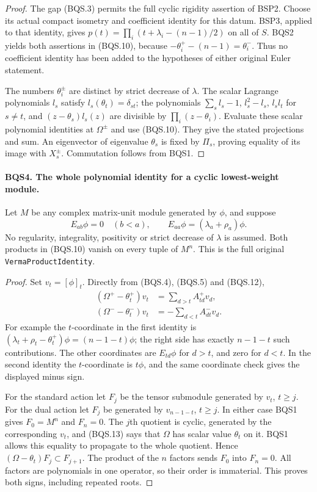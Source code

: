 \begin{proof}
The gap (BQS.3) permits the full cyclic rigidity assertion of BSP2.
Choose its actual compact isometry and coefficient identity for this
datum.  BSP3, applied to that identity, gives
$p(t)=\prod_i(t+\lambda_i-(n-1)/2)$ on all of $S$.
BQS2 yields both assertions in (BQS.10), because
$-\theta_i^+-(n-1)=\theta_i^-$.
Thus no coefficient identity has been added to the hypotheses of
either original Euler statement.

The numbers $\theta_i^\pm$ are distinct by strict decrease of $\lambda$.
The scalar Lagrange polynomials $l_s$ satisfy
$l_s(\theta_t)=\delta_{st}$; the polynomials
$\sum_s l_s-1$, $l_s^2-l_s$, $l_sl_t$ for $s\ne t$, and
$(z-\theta_s)l_s(z)$ are divisible by
$\prod_i(z-\theta_i)$.  Evaluate these scalar polynomial identities
at $\Omega^\pm$ and use (BQS.10).
They give the stated projections and sum.  An eigenvector of eigenvalue
$\theta_s$ is fixed by $\Pi_s$, proving equality of its image with
$X_s^\pm$.  Commutation follows from BQS1.
\end{proof}

\paragraph{BQS4. The whole polynomial identity for a cyclic lowest-weight module.}
\label{claim:BQS4}
Let $M$ be any complex matrix-unit module generated by $\phi$, and suppose
\[
 E_{ab}\phi=0\quad(b<a),\qquad
 E_{aa}\phi=(\lambda_a+\rho_a)\phi.
 \tag{BQS.12}
\]
No regularity, integrality, positivity or strict decrease of $\lambda$
is assumed.  Both products in (BQS.10) vanish on every tuple of $M^n$.
This is the full original \texttt{VermaProductIdentity}.

\begin{proof}
Set $v_t=[\phi]_t$.  Directly from (BQS.4), (BQS.5) and (BQS.12),
\[
\begin{aligned}
 (\Omega^+-\theta_t^+)v_t
    &=\sum_{d>t}A^+_{td}v_d,\\
 (\Omega^--\theta_t^-)v_t
    &=-\sum_{d<t}A^-_{dt}v_d .
\end{aligned}
\tag{BQS.13}
\]
For example the $t$-coordinate in the first identity is
$(\lambda_t+\rho_t-\theta_t^+)\phi=(n-1-t)\phi$;
the right side has exactly $n-1-t$ such contributions.  The other
coordinates are $E_{td}\phi$ for $d>t$, and zero for $d<t$.
In the second identity the $t$-coordinate is $t\phi$, and the same
coordinate check gives the displayed minus sign.

For the standard action let $F_j$ be the tensor submodule generated by
$v_t$, $t\ge j$.  For the dual action let $F_j$ be generated by
$v_{n-1-t}$, $t\ge j$.  In either case BQS1 gives $F_0=M^n$ and
$F_n=0$.  The $j$th quotient is cyclic, generated by the corresponding
$v_t$, and (BQS.13) says that $\Omega$ has scalar value $\theta_t$
on it.  BQS1 allows this equality to propagate to the whole quotient.
Hence $(\Omega-\theta_t)F_j\subset F_{j+1}$.
The product of the $n$ factors sends $F_0$ into $F_n=0$.
All factors are polynomials in one operator, so their order is
immaterial.  This proves both signs, including repeated roots.
\end{proof}

